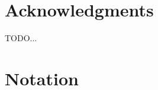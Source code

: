 \newpage\thispagestyle{empty}
\chapter*{Acknowledgments}

TODO...

\ifdeadtree
  \blankpage
\fi


\newpage\pagestyle{headings}

\ifsustyle
  \relax
\else
  \setlength{\cftbeforechapterskip}{0.5em}
\fi

\setcounter{tocdepth}{2}
\tableofcontents


\chapter*{Notation}




\mainmatter

\pagestyle{headings}







\ifsustyle
  
\fi
% 

\appendix




